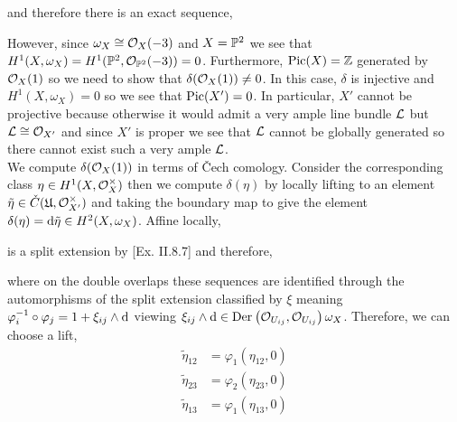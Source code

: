 \documentclass[12pt]{article}
\begin{document}
and therefore there is an exact sequence,
\begin{center}
\end{center}
However, since $\omega_X \cong \struct{X}(-3)$ and $X = \P^2$ we see that $H^1(X, \omega_X) = H^1(\P^2, \struct{\P^2}(-3)) = 0$. Furthermore, $\Pic{X} = \Z$ generated by $\struct{X}(1)$ so we need to show that $\delta(\struct{X}(1)) \neq 0$. In this case, $\delta$ is injective and $H^1(X, \omega_X) = 0$ so we see that $\Pic{X'} = 0$. In particular, $X'$ cannot be projective because otherwise it would admit a very ample line bundle $\L$ but $\L \cong \struct{X'}$ and since $X'$ is proper we see that $\L$ cannot be globally generated so there cannot exist such a very ample $\L$.
\bigskip\\
We compute $\delta(\struct{X}(1))$ in terms of \v{C}ech comology. Consider the corresponding class $\eta \in H^1(X, \struct{X}^\times)$ then we compute $\delta(\eta)$ by locally lifting to an element $\tilde{\eta} \in \check{C}(\U, \struct{X'}^\times)$ and taking the boundary map to give the element $\delta(\eta) = \d{\tilde{\eta}} \in H^2(X, \omega_X)$. Affine locally,
\begin{center}
\end{center}
is a split extension by [Ex. II.8.7] and therefore,
\begin{center}
\end{center}
where on the double overlaps these sequences are identified through the automorphisms of the split extension classified by $\xi$ meaning $\varphi_i^{-1} \circ \varphi_j = 1 + \xi_{ij} \wedge \d$ viewing $\xi_{ij} \wedge \d \in \Der{\struct{U_{ij}}}{\struct{U_{ij}}}{\omega_X}$.
Therefore, we can choose a lift, 
\begin{align*}
\tilde{\eta}_{12} & = \varphi_1(\eta_{12}, 0)
\\
\tilde{\eta}_{23} & = \varphi_2(\eta_{23}, 0)
\\
\tilde{\eta}_{13} & = \varphi_1(\eta_{13}, 0)
\end{align*}
\end{document}
